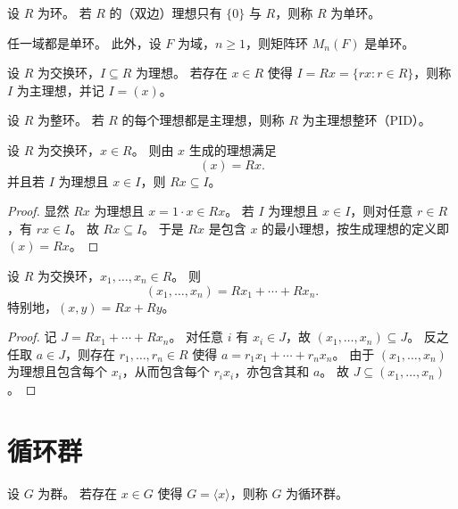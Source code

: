 \documentclass[lang=cn,a4paper,newtx]{elegantbook}
\begin{document}
\begin{definition}[单环]
设 $R$ 为环。
若 $R$ 的（双边）理想只有 $\{0\}$ 与 $R$，则称 $R$ 为单环。
\end{definition}

\begin{example}
任一域都是单环。
此外，设 $F$ 为域，$n\ge 1$，则矩阵环 $M_n(F)$ 是单环。
\end{example}

\begin{definition}[主理想]
设 $R$ 为交换环，$I\subseteq R$ 为理想。
若存在 $x\in R$ 使得 $I=Rx=\{rx:r\in R\}$，则称 $I$ 为主理想，并记 $I=(x)$。
\end{definition}

\begin{definition}[主理想整环]
设 $R$ 为整环。
若 $R$ 的每个理想都是主理想，则称 $R$ 为主理想整环（PID）。
\end{definition}

\begin{proposition}
设 $R$ 为交换环，$x\in R$。
则由 $x$ 生成的理想满足
\[
  (x)=Rx.
\]
并且若 $I$ 为理想且 $x\in I$，则 $Rx\subseteq I$。
\end{proposition}

\begin{proof}
显然 $Rx$ 为理想且 $x=1\cdot x\in Rx$。
若 $I$ 为理想且 $x\in I$，则对任意 $r\in R$，有 $rx\in I$。
故 $Rx\subseteq I$。
于是 $Rx$ 是包含 $x$ 的最小理想，按生成理想的定义即 $(x)=Rx$。
\end{proof}

\begin{proposition}
设 $R$ 为交换环，$x_1,\dots,x_n\in R$。
则
\[
  (x_1,\dots,x_n)=Rx_1+\cdots+Rx_n.
\]
特别地，$(x,y)=Rx+Ry$。
\end{proposition}

\begin{proof}
记 $J=Rx_1+\cdots+Rx_n$。
对任意 $i$ 有 $x_i\in J$，故 $(x_1,\dots,x_n)\subseteq J$。
反之任取 $a\in J$，则存在 $r_1,\dots,r_n\in R$ 使得 $a=r_1x_1+\cdots+r_nx_n$。
由于 $(x_1,\dots,x_n)$ 为理想且包含每个 $x_i$，从而包含每个 $r_ix_i$，亦包含其和 $a$。
故 $J\subseteq (x_1,\dots,x_n)$。
\end{proof}

\section{循环群}

\begin{definition}[循环群]
设 $G$ 为群。
若存在 $x\in G$ 使得 $G=\langle x\rangle$，则称 $G$ 为循环群。
\end{definition}
\end{document}
